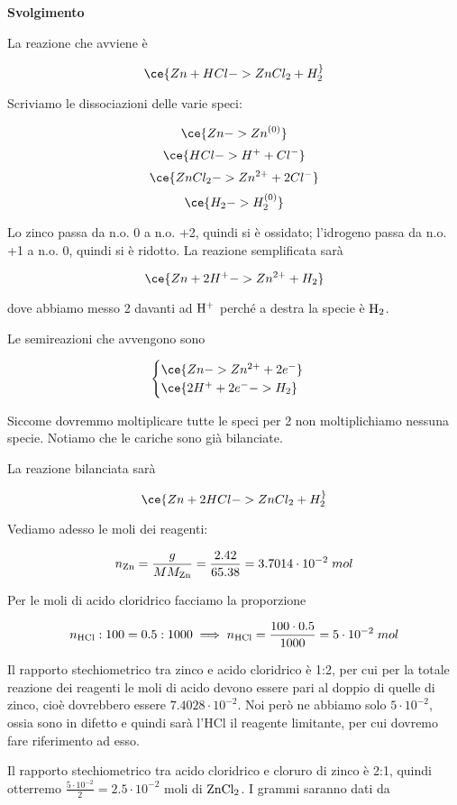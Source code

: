 \vspace{0.2cm}\large\textbf{Svolgimento}\normalsize

\vspace{0.2cm}La reazione che avviene è

$$\ce{Zn + HCl -> ZnCl_2 + H_2 ^}$$

Scriviamo le dissociazioni delle varie speci:

$$\ce{Zn -> Zn^{(0)}}$$
$$\ce{HCl -> H^+ + Cl^-}$$
$$\ce{ZnCl_2 -> Zn^{2+} + 2Cl^-}$$
$$\ce{H_2 -> H_2^{(0)}}$$

Lo zinco passa da n.o. 0 a n.o. +2, quindi si è ossidato; l'idrogeno passa da n.o. +1 a n.o. 0, quindi si è ridotto. La reazione semplificata sarà

$$\ce{Zn + 2H^+ -> Zn^{2+} + H_2}$$

dove abbiamo messo 2 davanti ad $\rm H^+$ perché a destra la specie è $\rm H_2$.

Le semireazioni che avvengono sono

$$\begin{cases}
    \ce{Zn -> Zn^{2+} + 2e^-}\\
    \ce{2H^{+} + 2e^- -> H_2}
\end{cases}$$

Siccome dovremmo moltiplicare tutte le speci per 2 non moltiplichiamo nessuna specie. Notiamo che le cariche sono già bilanciate.

La reazione bilanciata sarà

$$\ce{Zn + 2HCl -> ZnCl_2 + H_2 ^}$$

Vediamo adesso le moli dei reagenti:

$$n_{\rm Zn}=\frac{g}{MM_{\rm Zn}}=\frac{2.42}{65.38}=3.7014 \cdot 10^{-2}\;mol$$

Per le moli di acido cloridrico facciamo la proporzione

$$n_{\rm HCl}:100=0.5:1000
\implies
n_{\rm HCl}=\frac{100 \cdot 0.5}{1000}=5 \cdot 10^{-2}\;mol$$

Il rapporto stechiometrico tra zinco e acido cloridrico è 1:2, per cui per la totale reazione dei reagenti le moli di acido devono essere pari al doppio di quelle di zinco, cioè dovrebbero essere $7.4028 \cdot 10^{-2}$. Noi però ne abbiamo solo $5 \cdot 10^{-2}$, ossia sono in difetto e quindi sarà l'HCl il reagente limitante, per cui dovremo fare riferimento ad esso.

Il rapporto stechiometrico tra acido cloridrico e cloruro di zinco è 2:1, quindi otterremo $\frac{5\cdot 10^{-2}}{2}=2.5 \cdot 10^{-2}$ moli di $\rm ZnCl_2$. I grammi saranno dati da

